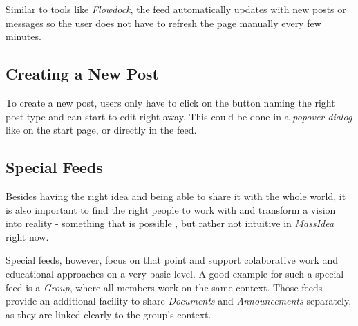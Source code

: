 \documentclass[a4paper, notitlepage, oneside]{article}
\begin{document}
Similar to tools like \emph{Flowdock}, the feed automatically updates with new posts or messages so the user does not have to refresh the page manually every few minutes. 

\subsection{Creating a New Post}

To create a new post, users only have to click on the button naming the right post type and can start to edit right away. This could be done in a \emph{popover dialog} like on the start page, or directly in the feed.

\subsection{Special Feeds}
\label{sec:special_feed}

Besides having the right idea and being able to share it with the whole world, it is also important to find the right people to work with and transform a vision into reality - something that is possible , but rather not intuitive in \emph{MassIdea} right now. 

Special feeds, however, focus on that point and support colaborative work and educational approaches on a very basic level. A good example for such a special feed is a \emph{Group}, where all members work on the same context. Those feeds provide an additional facility to share \emph{Documents} and \emph{Announcements} separately, as they are linked clearly to the group's context. 
\end{document}
